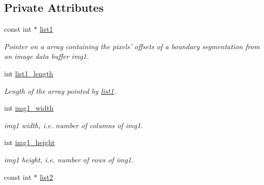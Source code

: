 \subsection*{Private Attributes}
\begin{DoxyCompactItemize}
\item 
\hypertarget{classofeli_1_1_hausdorff_distance_a363ef19e82b2743e828ec0a613b81a1d}{const int $\ast$ \hyperlink{classofeli_1_1_hausdorff_distance_a363ef19e82b2743e828ec0a613b81a1d}{list1}}\label{classofeli_1_1_hausdorff_distance_a363ef19e82b2743e828ec0a613b81a1d}

\begin{DoxyCompactList}\small\item\em Pointer on a array containing the pixels' offsets of a boundary segmentation from an image data buffer {\itshape img1}. \end{DoxyCompactList}\item 
\hypertarget{classofeli_1_1_hausdorff_distance_afc53a51bbfac8467c349c50be57e3145}{int \hyperlink{classofeli_1_1_hausdorff_distance_afc53a51bbfac8467c349c50be57e3145}{list1\-\_\-length}}\label{classofeli_1_1_hausdorff_distance_afc53a51bbfac8467c349c50be57e3145}

\begin{DoxyCompactList}\small\item\em Length of the array pointed by \hyperlink{classofeli_1_1_hausdorff_distance_a363ef19e82b2743e828ec0a613b81a1d}{list1}. \end{DoxyCompactList}\item 
\hypertarget{classofeli_1_1_hausdorff_distance_a08a977f3abbb359c8f908b4df821c901}{int \hyperlink{classofeli_1_1_hausdorff_distance_a08a977f3abbb359c8f908b4df821c901}{img1\-\_\-width}}\label{classofeli_1_1_hausdorff_distance_a08a977f3abbb359c8f908b4df821c901}

\begin{DoxyCompactList}\small\item\em {\itshape img1} width, i.\-e. number of columns of {\itshape img1}. \end{DoxyCompactList}\item 
\hypertarget{classofeli_1_1_hausdorff_distance_af0c40e9fa7899ecd56147691be6b0399}{int \hyperlink{classofeli_1_1_hausdorff_distance_af0c40e9fa7899ecd56147691be6b0399}{img1\-\_\-height}}\label{classofeli_1_1_hausdorff_distance_af0c40e9fa7899ecd56147691be6b0399}

\begin{DoxyCompactList}\small\item\em {\itshape img1} height, i.\-e. number of rows of {\itshape img1}. \end{DoxyCompactList}\item 
\hypertarget{classofeli_1_1_hausdorff_distance_a214f70f274ec1099b0b3fda1e5060c1f}{const int $\ast$ \hyperlink{classofeli_1_1_hausdorff_distance_a214f70f274ec1099b0b3fda1e5060c1f}{list2}}\label{classofeli_1_1_hausdorff_distance_a214f70f274ec1099b0b3fda1e5060c1f}


\end{DoxyCompactItemize}
